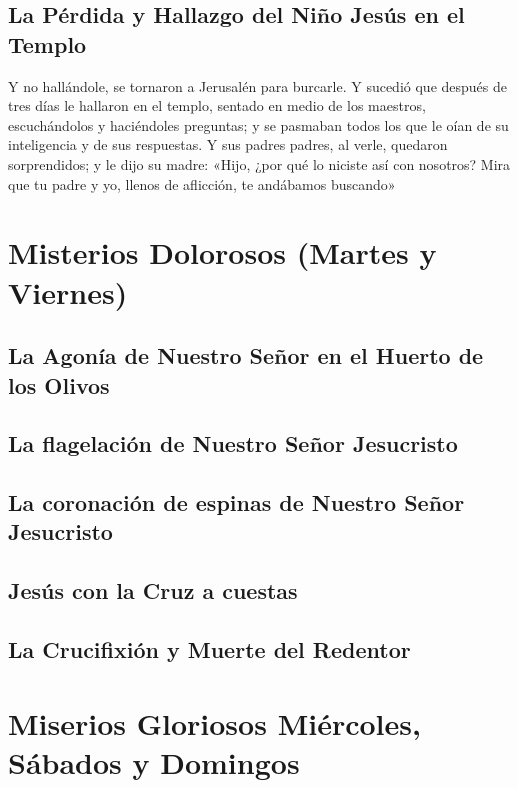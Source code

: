 \documentclass[a4paper,11pt, oneside]{report}
\begin{document}
      \subsection{La Pérdida y Hallazgo del Niño Jesús en el Templo}
        Y no hallándole, se tornaron a Jerusalén para burcarle. Y sucedió que después de tres días le hallaron en el templo, sentado en medio de los maestros,
        escuchándolos y haciéndoles preguntas; y se pasmaban todos los que le oían de su inteligencia y de sus respuestas. Y sus padres padres, al verle, quedaron
        sorprendidos; y le dijo su madre: «Hijo, ¿por qué lo niciste así con nosotros? Mira que tu padre y yo, llenos de aflicción, te andábamos buscando»
        
      \newpage

    \section{Misterios Dolorosos (Martes y Viernes)}
      
      \subsection{La Agonía de Nuestro Señor en el Huerto de los Olivos}
        
      \subsection{La flagelación de Nuestro Señor Jesucristo}
        
      \subsection{La coronación de espinas de Nuestro Señor Jesucristo}
      
      \subsection{Jesús con la Cruz a cuestas}
        
      \subsection{La Crucifixión y Muerte del Redentor}
          
    \section{Miserios Gloriosos {Miércoles, Sábados y Domingos}}
\end{document}
